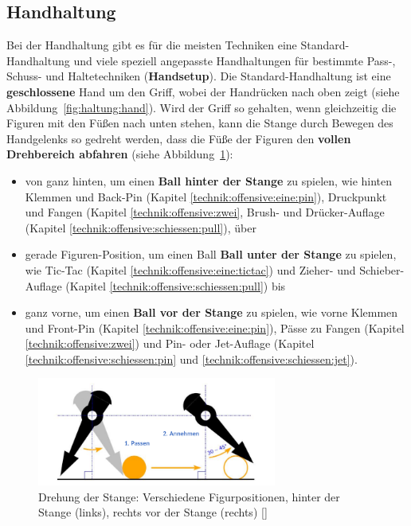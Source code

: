 \subsection{Handhaltung}
\label{technik:haltung:griffe}

Bei der Handhaltung gibt es für die meisten Techniken eine Standard-Handhaltung und viele speziell angepasste Handhaltungen für bestimmte Pass-, Schuss- und Haltetechniken (\textbf{Handsetup}). 
Die Standard-Handhaltung ist eine \textbf{geschlossene} Hand um den Griff, 
wobei der Handrücken nach oben zeigt (siehe Abbildung~\ref{fig:haltung:hand}).
Wird der Griff so gehalten, wenn gleichzeitig die Figuren mit den Füßen nach unten stehen, kann die Stange durch Bewegen des Handgelenks so gedreht werden, dass die Füße der Figuren den \textbf{vollen Drehbereich abfahren} (siehe Abbildung~\ref{fig:haltung:figur}):
\begin{itemize}
    \item von ganz hinten, um einen \textbf{Ball hinter der Stange} zu spielen, wie hinten Klemmen und Back-Pin (Kapitel \ref{technik:offensive:eine:pin}), Druckpunkt und Fangen (Kapitel \ref{technik:offensive:zwei}, Brush- und Drücker-Auflage (Kapitel \ref{technik:offensive:schiessen:pull}), über
\label{technik:offensive:eine:tictac}
    \item gerade Figuren-Position, um einen Ball \textbf{Ball unter der Stange} zu spielen, wie Tic-Tac (Kapitel \ref{technik:offensive:eine:tictac}) und Zieher- und Schieber-Auflage (Kapitel \ref{technik:offensive:schiessen:pull}) bis 
    \item ganz vorne, um einen \textbf{Ball vor der Stange} zu spielen, wie vorne Klemmen und Front-Pin (Kapitel \ref{technik:offensive:eine:pin}), Pässe zu Fangen (Kapitel \ref{technik:offensive:zwei}) und Pin- oder Jet-Auflage (Kapitel \ref{technik:offensive:schiessen:pin} und \ref{technik:offensive:schiessen:jet}).
\end{itemize}

\begin{figure}
    \centering 
        \includegraphics[width=0.7\textwidth]{img/haltung_figur.png} 
        \caption{Drehung der Stange: Verschiedene Figurpositionen, hinter der Stange (links), rechts vor der Stange (rechts) [\cite{itsf_basics}]} 
        \label{fig:haltung:figur} 
\end{figure}


